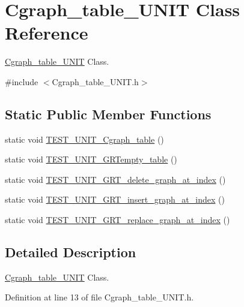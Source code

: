 \hypertarget{class_cgraph__table___u_n_i_t}{}\section{Cgraph\+\_\+table\+\_\+\+U\+N\+I\+T Class Reference}
\label{class_cgraph__table___u_n_i_t}


\hyperlink{class_cgraph__table___u_n_i_t}{Cgraph\+\_\+table\+\_\+\+U\+N\+I\+T} Class.  




{\ttfamily \#include $<$Cgraph\+\_\+table\+\_\+\+U\+N\+I\+T.\+h$>$}

\subsection*{Static Public Member Functions}
\begin{DoxyCompactItemize}
\item 
static void \hyperlink{class_cgraph__table___u_n_i_t_a04573717abf01682c609eea51388ec40}{T\+E\+S\+T\+\_\+\+U\+N\+I\+T\+\_\+\+Cgraph\+\_\+table} ()
\item 
static void \hyperlink{class_cgraph__table___u_n_i_t_a0adeae0b1160e3289d707a6cfc160b7c}{T\+E\+S\+T\+\_\+\+U\+N\+I\+T\+\_\+\+G\+R\+Tempty\+\_\+table} ()
\item 
static void \hyperlink{class_cgraph__table___u_n_i_t_a4e060c1a29a7a9e26cc005ea94049e89}{T\+E\+S\+T\+\_\+\+U\+N\+I\+T\+\_\+\+G\+R\+T\+\_\+delete\+\_\+graph\+\_\+at\+\_\+index} ()
\item 
static void \hyperlink{class_cgraph__table___u_n_i_t_a89a7696c6851df4d449842e585bd936c}{T\+E\+S\+T\+\_\+\+U\+N\+I\+T\+\_\+\+G\+R\+T\+\_\+insert\+\_\+graph\+\_\+at\+\_\+index} ()
\item 
static void \hyperlink{class_cgraph__table___u_n_i_t_ab3ddda590372f2992112626466e0514f}{T\+E\+S\+T\+\_\+\+U\+N\+I\+T\+\_\+\+G\+R\+T\+\_\+replace\+\_\+graph\+\_\+at\+\_\+index} ()
\end{DoxyCompactItemize}


\subsection{Detailed Description}
\hyperlink{class_cgraph__table___u_n_i_t}{Cgraph\+\_\+table\+\_\+\+U\+N\+I\+T} Class. 

Definition at line 13 of file Cgraph\+\_\+table\+\_\+\+U\+N\+I\+T.\+h.



